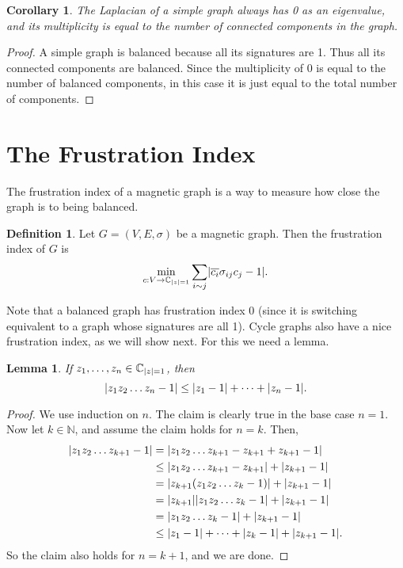 \documentclass[12pt]{article}
\newtheorem{corollary}[thm]{Corollary}
\newtheorem{lem}[thm]{Lemma}
\theoremstyle{definition}
\newtheorem{defn}[thm]{Definition}
\newcommand{\N}{\mathbb N}
\newcommand{\C}{\mathbb C}
\DeclarePairedDelimiter\abs{\lvert}{\rvert}%
\begin{document}
\begin{corollary}
The Laplacian of a simple graph always has 0 as an eigenvalue, and its multiplicity is equal to the number of connected components in the graph.
\end{corollary}
\begin{proof}
A simple graph is balanced because all its signatures are 1. Thus all its connected components are balanced. Since the multiplicity of 0 is equal to the number of balanced components, in this case it is just equal to the total number of components.
\end{proof}

\section{The Frustration Index}
The frustration index of a magnetic graph is a way to measure how close the graph is to being balanced.

\begin{defn}
Let $G = (V, E, \sigma)$ be a magnetic graph. Then the frustration index of $G$ is 
$$
\min_{c: V \rightarrow \C_{\abs*z = 1}}
\sum_{i \sim j} 
\abs*{\overline{c_i} \sigma_{ij} c_j - 1}.
$$
\end{defn}

Note that a balanced graph has frustration index 0 (since it is switching equivalent to a graph whose signatures are all 1). Cycle graphs also have a nice frustration index, as we will show next. For this we need a lemma.

\begin{lem}\label{lemma for cycle frustration}
If $z_1, \dots, z_n \in \C_{\abs*z = 1}$, then
$$
\abs*{z_1 z_2 \dots z_n - 1} \leq \abs*{z_1 - 1} + \dots + \abs*{z_n - 1}.
$$
\end{lem}
\begin{proof}
We use induction on $n$. The claim is clearly true in the base case $n = 1$. Now let $k \in \N$, and assume the claim holds for $n = k$. Then,
\begin{align*}
\abs*{z_1 z_2 \dots z_{k+1} - 1}
&= \abs*{z_1 z_2 \dots z_{k+1} - z_{k+1} + z_{k+1} - 1} \\
&\leq \abs*{z_1 z_2 \dots z_{k+1} - z_{k+1}} + \abs*{z_{k+1} - 1}\\
&= \abs*{z_{k+1}(z_1 z_2 \dots z_{k} - 1)} + \abs*{z_{k+1} - 1} \\
&= \abs*{z_{k+1}} \abs*{z_1 z_2 \dots z_{k} - 1} + \abs*{z_{k+1} - 1} \\
&= \abs*{z_1 z_2 \dots z_{k} - 1} + \abs*{z_{k+1} - 1} \\
&\leq \abs*{z_1 - 1} + \dots + \abs*{z_k - 1} + \abs*{z_{k+1} - 1}.
\end{align*}
So the claim also holds for $n = k + 1$, and we are done.
\end{proof}
\end{document}
